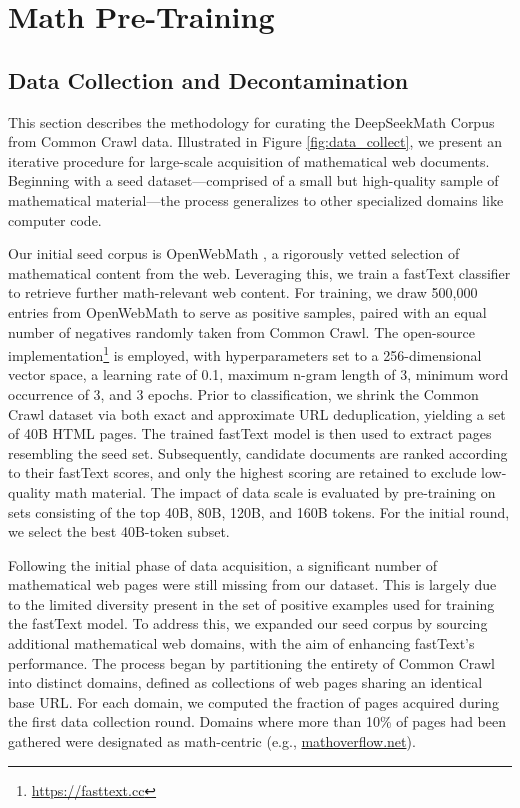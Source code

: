 \section{Math Pre-Training}

\subsection{Data Collection and Decontamination} This section describes the methodology for curating the DeepSeekMath Corpus from Common Crawl data. Illustrated in Figure \ref{fig:data_collect}, we present an iterative procedure for large-scale acquisition of mathematical web documents. Beginning with a seed dataset—comprised of a small but high-quality sample of mathematical material—the process generalizes to other specialized domains like computer code.

Our initial seed corpus is OpenWebMath \citep{openwebmath}, a rigorously vetted selection of mathematical content from the web. Leveraging this, we train a fastText classifier \citep{joulin2016fasttext} to retrieve further math-relevant web content. For training, we draw 500,000 entries from OpenWebMath to serve as positive samples, paired with an equal number of negatives randomly taken from Common Crawl. The open-source implementation\footnote{\url{https://fasttext.cc}} is employed, with hyperparameters set to a 256-dimensional vector space, a learning rate of 0.1, maximum n-gram length of 3, minimum word occurrence of 3, and 3 epochs. Prior to classification, we shrink the Common Crawl dataset via both exact and approximate URL deduplication, yielding a set of 40B HTML pages. The trained fastText model is then used to extract pages resembling the seed set. Subsequently, candidate documents are ranked according to their fastText scores, and only the highest scoring are retained to exclude low-quality math material. The impact of data scale is evaluated by pre-training on sets consisting of the top 40B, 80B, 120B, and 160B tokens. For the initial round, we select the best 40B-token subset.

Following the initial phase of data acquisition, a significant number of mathematical web pages were still missing from our dataset. This is largely due to the limited diversity present in the set of positive examples used for training the fastText model. To address this, we expanded our seed corpus by sourcing additional mathematical web domains, with the aim of enhancing fastText's performance. The process began by partitioning the entirety of Common Crawl into distinct domains, defined as collections of web pages sharing an identical base URL. For each domain, we computed the fraction of pages acquired during the first data collection round. Domains where more than 10\% of pages had been gathered were designated as math-centric (e.g., \url{mathoverflow.net}).

